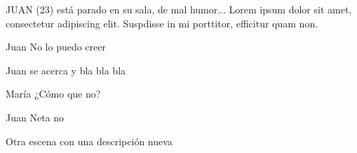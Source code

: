 \documentclass{screenplay}[2012/06/30]
\begin{document}

\thispagestyle{empty}



\fadein


JUAN (23) está parado en su sala, de mal humor... Lorem ipsum dolor sit amet, consectetur adipiscing elit. Suspdisse in mi porttitor, efficitur quam non.

\begin{dialogue}[]{Juan}
    No lo puedo creer
\end{dialogue}

Juan se acerca y bla bla bla

\begin{dialogue}[Enojada]{María}
    ¿Cómo que no?
\end{dialogue}

\begin{dialogue}[]{Juan \contd}
    Neta no
\end{dialogue}

\corte

Otra escena con una descripción nueva

\final
\end{document}
